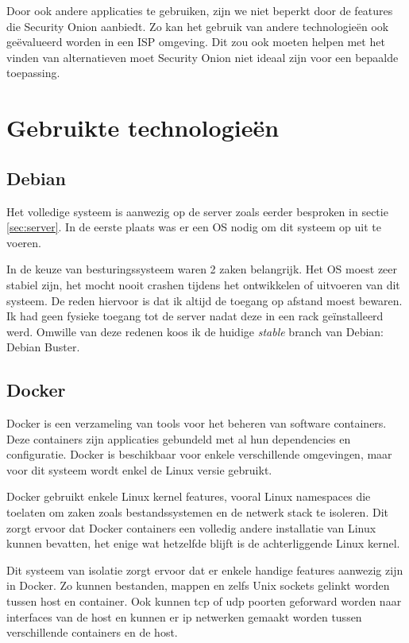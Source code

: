 \documentclass[a4paper, 12pt]{report}
\begin{document}
Door ook andere applicaties te gebruiken, zijn we niet beperkt door de features die Security Onion aanbiedt.
Zo kan het gebruik van andere technologieën ook geëvalueerd worden in een ISP omgeving.
Dit zou ook moeten helpen met het vinden van alternatieven moet Security Onion niet ideaal zijn voor een bepaalde toepassing.

\section{Gebruikte technologie\"en}
\subsection{Debian}
Het volledige systeem is aanwezig op de server zoals eerder besproken in sectie \ref{sec:server}.
In de eerste plaats was er een OS nodig om dit systeem op uit te voeren.

In de keuze van besturingssysteem waren 2 zaken belangrijk.
Het OS moest zeer stabiel zijn, het mocht nooit crashen tijdens het ontwikkelen of uitvoeren van dit systeem.
De reden hiervoor is dat ik altijd de toegang op afstand moest bewaren.
Ik had geen fysieke toegang tot de server nadat deze in een rack geïnstalleerd werd.
Omwille van deze redenen koos ik de huidige \emph{stable} branch van Debian: Debian Buster.

\subsection{Docker}
Docker is een verzameling van tools voor het beheren van software containers.
Deze containers zijn applicaties gebundeld met al hun dependencies en configuratie.
Docker is beschikbaar voor enkele verschillende omgevingen, maar voor dit systeem wordt enkel de Linux versie gebruikt.

Docker gebruikt enkele Linux kernel features, vooral Linux namespaces die toelaten om zaken zoals bestandssystemen en de netwerk stack te isoleren.
Dit zorgt ervoor dat Docker containers een volledig andere installatie van Linux kunnen bevatten, het enige wat hetzelfde blijft is de achterliggende Linux kernel.

Dit systeem van isolatie zorgt ervoor dat er enkele handige features aanwezig zijn in Docker.
Zo kunnen bestanden, mappen en zelfs Unix sockets gelinkt worden tussen host en container.
Ook kunnen tcp of udp poorten geforward worden naar interfaces van de host en kunnen er ip netwerken gemaakt worden tussen verschillende containers en de host.
\end{document}
